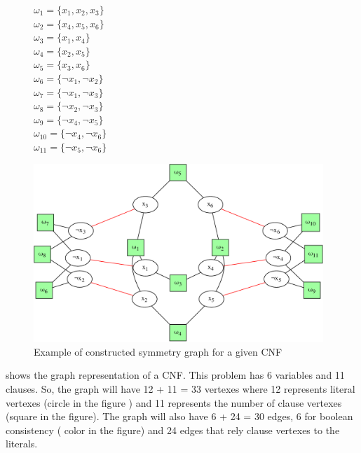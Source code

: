 \begin{figure}[h!]
 \begin{minipage}[c]{.2\textwidth}
  $\omega_{1} = \{ x_{1}, x_{2}, x_{3} \}$ \\
  $\omega_{2} = \{ x_{4}, x_{5}, x_{6} \}$ \\
  $\omega_{3} = \{ x_{1}, x_{4} \}$ \\
  $\omega_{4} = \{ x_{2}, x_{5} \}$ \\
  $\omega_{5} = \{ x_{3}, x_{6} \}$ \\
  $\omega_{6} = \{ \neg x_{1}, \neg x_{2} \}$ \\
  $\omega_{7} = \{ \neg x_{1}, \neg x_{3} \}$ \\
  $\omega_{8} = \{ \neg x_{2}, \neg x_{3} \}$ \\
  $\omega_{9} = \{ \neg x_{4}, \neg x_{5} \}$ \\
  $\omega_{10} = \{ \neg x_{4}, \neg x_{6} \}$ \\
  $\omega_{11} = \{ \neg x_{5}, \neg x_{6} \}$ \\
  
 \end{minipage}
 \begin{minipage}[l]{.75\textwidth}
  \includegraphics[width=4.3in]{cnfs/graph_cnf_no_opt-crop}
 \end{minipage}
 \caption{Example of constructed symmetry graph for a given CNF}
 \label{fig:graph_no_opt}
\end{figure}

 shows the graph representation of a CNF. This problem has 6 variables and 11
clauses. So, the graph will have  12  + 11 = 33 vertexes where 12 represents literal vertexes (circle in the figure ) 
and 11 represents the number of clause vertexes (square in the figure). The graph will also have 6 + 24 = 30 edges, 6 for boolean consistency 
( color in the figure) and 24 edges that rely clause vertexes to the literals.

